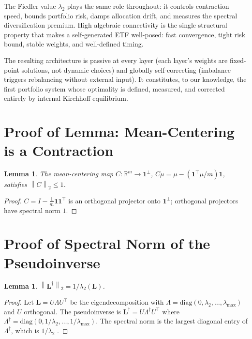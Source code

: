 \documentclass[twocolumn,11pt,a4paper]{article}
\theoremstyle{plain}
\newtheorem{lemma}[theorem]{Lemma}
\theoremstyle{definition}
\theoremstyle{remark}
\newcommand{\R}{\mathbb{R}}
\newcommand{\Lop}{\mathbf{L}}        %
\newcommand{\Lpinv}{\mathbf{L}^{\dagger}} %
\newcommand{\lam}{\lambda}
\newcommand{\lamtwo}{\lambda_2}
\newcommand{\lammax}{\lambda_{\max}}
\newcommand{\norm}[1]{\left\|#1\right\|}
\newcommand{\one}{\mathbf{1}}
\begin{document}
The Fiedler value $\lamtwo$ plays the same role throughout: it
controls contraction speed, bounds portfolio risk, damps allocation
drift, and measures the spectral diversification premium.  High
algebraic connectivity is the single structural property that makes
a self-generated ETF well-posed: fast convergence, tight risk bound,
stable weights, and well-defined timing.

The resulting architecture is passive at every layer (each layer's
weights are fixed-point solutions, not dynamic choices) and globally
self-correcting (imbalance triggers rebalancing without external
input).  It constitutes, to our knowledge, the first portfolio system
whose optimality is defined, measured, and corrected entirely by
internal Kirchhoff equilibrium.

\appendix
\section{Proof of Lemma: Mean-Centering is a Contraction}
\label{app:mean_centering}

\begin{lemma}
  The mean-centering map $C:\R^m\to\one^{\perp}$,
  $C\mu=\mu-(\one^{\top}\mu/m)\one$, satisfies $\norm{C}_2\le 1$.
\end{lemma}

\begin{proof}
  $C=I-\frac{1}{m}\one\one^{\top}$ is an orthogonal projector onto
  $\one^{\perp}$; orthogonal projectors have spectral norm $1$.
\end{proof}

\section{Proof of Spectral Norm of the Pseudoinverse}
\label{app:pseudoinverse}

\begin{lemma}
  $\norm{\Lpinv}_2=1/\lamtwo(\Lop)$.
\end{lemma}

\begin{proof}
  Let $\Lop=U\Lambda U^{\top}$ be the eigendecomposition with
  $\Lambda=\mathrm{diag}(0,\lam_2,\dots,\lammax)$ and $U$ orthogonal.
  The pseudoinverse is $\Lpinv=U\Lambda^{\dagger}U^{\top}$ where
  $\Lambda^{\dagger}=\mathrm{diag}(0,1/\lam_2,\dots,1/\lammax)$.
  The spectral norm is the largest diagonal entry of $\Lambda^{\dagger}$,
  which is $1/\lam_2$ \cite{GolubVanLoan1996}.
\end{proof}
\end{document}
